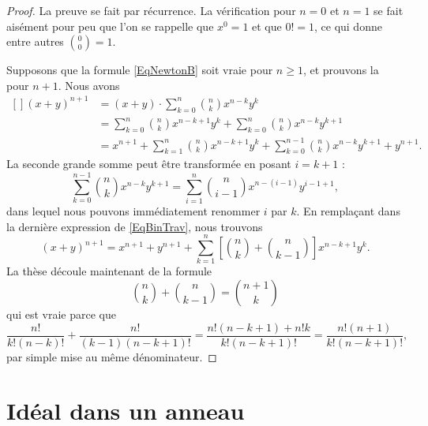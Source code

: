 \begin{proof}
    La preuve se fait par récurrence. La vérification pour $n=0$ et $n=1$ se fait aisément pour peu que l'on se rappelle que \( x^0=1\) et que \( 0!=1\), ce qui donne entre autres \( {0\choose 0}=1\).

    Supposons que la formule \eqref{EqNewtonB} soit vraie pour $n\geq1$, et prouvons la pour $n+1$. Nous avons
\begin{equation}        \label{EqBinTrav}
    \begin{aligned}[]
        (x+y)^{n+1} &=(x+y)\cdot  \sum_{k=0}^n{n\choose k}x^{n-k}y^k\\
                &= \sum_{k=0}^n{n\choose k}x^{n-k+1}y^k+\sum_{k=0}^n{n\choose k}x^{n-k}y^{k+1}\\
                &=x^{n+1}+ \sum_{k=1}^n{n\choose k}x^{n-k+1}y^k+\sum_{k=0}^{n-1}{n\choose k}x^{n-k}y^{k+1}+y^{n+1}.
    \end{aligned}
\end{equation}
La seconde grande somme peut être transformée en posant $i=k+1$ :
\begin{equation}
    \sum_{k=0}^{n-1}{n\choose k}x^{n-k}y^{k+1}  =\sum_{i=1}^n{n\choose i-1}x^{n-(i-1)}y^{i-1+1},
\end{equation}
dans lequel nous pouvons immédiatement renommer $i$ par $k$. En remplaçant dans la dernière expression de \eqref{EqBinTrav}, nous trouvons
\begin{equation}
    (x+y)^{n+1}=x^{n+1}+y^{n+1}+\sum_{k=1}^n\left[ {n\choose k}+{n\choose k-1} \right]x^{n-k+1}y^k.
\end{equation}
La thèse découle maintenant de la formule
\begin{equation}
    {n\choose k}+{n\choose k-1}={n+1\choose k}
\end{equation}
qui est vraie parce que
\begin{equation}
    \frac{ n! }{ k!(n-k)! }+\frac{ n! }{ (k-1)(n-k+1)! }=\frac{ n!(n-k+1)+n!k }{ k!(n-k+1)! }=\frac{ n!(n+1) }{  k!(n-k+1)!  },
\end{equation}
par simple mise au même dénominateur.
\end{proof}

\section{Idéal dans un anneau}

